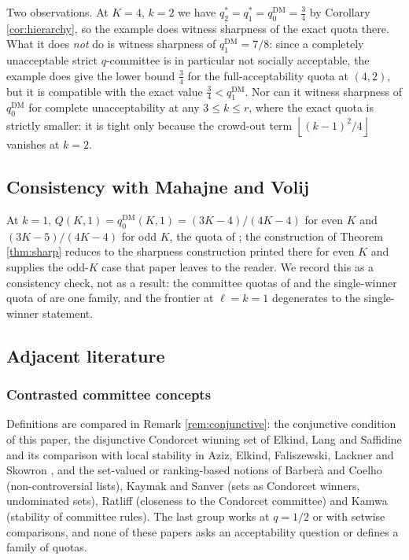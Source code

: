 \documentclass[11pt]{article}
\theoremstyle{plain}
\theoremstyle{definition}
\newcommand{\fl}[1]{\left\lfloor #1\right\rfloor}
\newcommand{\DM}{\mathrm{DM}}
\begin{document}
Two observations. At $K=4$, $k=2$ we have $q_2^*=q_1^*=q_0^{\DM}=\frac34$ by Corollary \ref{cor:hierarchy}, so the example does witness sharpness of the exact quota there. What it does \emph{not} do is witness sharpness of $q_1^{\DM}=7/8$: since a completely unacceptable strict $q$-committee is in particular not socially acceptable, the example does give the lower bound $\frac34$ for the full-acceptability quota at $(4,2)$, but it is compatible with the exact value $\frac34<q_1^{\DM}$. Nor can it witness sharpness of $q_0^{\DM}$ for complete unacceptability at any $3\le k\le r$, where the exact quota is strictly smaller: it is tight only because the crowd-out term $\fl{(k-1)^2/4}$ vanishes at $k=2$.

\subsection{Consistency with Mahajne and Volij}

At $k=1$, $Q(K,1)=q_0^{\DM}(K,1)=(3K-4)/(4K-4)$ for even $K$ and $(3K-5)/(4K-4)$ for odd $K$, the quota of \cite{MahajneVolij2019}; the construction of Theorem \ref{thm:sharp} reduces to the sharpness construction printed there for even $K$ and supplies the odd-$K$ case that paper leaves to the reader. We record this as a consistency check, not as a result: the committee quotas of \cite{DissMahajne2020} and the single-winner quota of \cite{MahajneVolij2019} are one family, and the frontier at $\ell=k=1$ degenerates to the single-winner statement.

\subsection{Adjacent literature}
\label{sec:related-lit}

\subsubsection*{Contrasted committee concepts}
Definitions are compared in Remark \ref{rem:conjunctive}: the conjunctive condition of this paper, the disjunctive Condorcet winning set of Elkind, Lang and Saffidine \cite{ElkindLangSaffidine2015} and its comparison with local stability in Aziz, Elkind, Faliszewski, Lackner and Skowron \cite{AzizEtAl2017}, and the set-valued or ranking-based notions of Barberà and Coelho \cite{BarberaCoelho2008} (non-controversial lists), Kaymak and Sanver \cite{KaymakSanver2003} (sets as Condorcet winners, undominated sets), Ratliff \cite{Ratliff2003} (closeness to the Condorcet committee) and Kamwa \cite{Kamwa2017} (stability of committee rules). The last group works at $q=1/2$ or with setwise comparisons, and none of these papers asks an acceptability question or defines a family of quotas.
\end{document}
